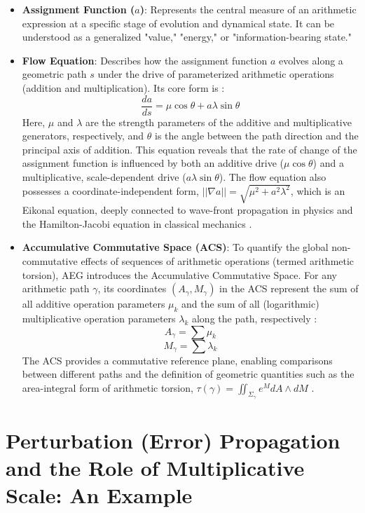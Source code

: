 \documentclass{article}
\begin{document}
\begin{itemize}
    \item \textbf{Assignment Function ($a$)}: Represents the central measure of an arithmetic expression at a specific stage of evolution and dynamical state. It can be understood as a generalized "value," "energy," or "information-bearing state."
    \item \textbf{Flow Equation}: Describes how the assignment function $a$ evolves along a geometric path $s$ under the drive of parameterized arithmetic operations (addition and multiplication). Its core form is \cite[Sec 3.1, Eq. 30]{YuanAEG}:
    $$\frac{da}{ds} = \mu \cos\theta + a\lambda \sin\theta$$
    Here, $\mu$ and $\lambda$ are the strength parameters of the additive and multiplicative generators, respectively, and $\theta$ is the angle between the path direction and the principal axis of addition. This equation reveals that the rate of change of the assignment function is influenced by both an additive drive ($\mu \cos\theta$) and a multiplicative, scale-dependent drive ($a\lambda \sin\theta$). The flow equation also possesses a coordinate-independent form, $||\nabla a|| = \sqrt{\mu^2 + a^2\lambda^2}$, which is an Eikonal equation, deeply connected to wave-front propagation in physics and the Hamilton-Jacobi equation in classical mechanics \cite[Sec 3.5, Eq. 57, 58]{YuanAEG}.
    \item \textbf{Accumulative Commutative Space (ACS)}: To quantify the global non-commutative effects of sequences of arithmetic operations (termed arithmetic torsion), AEG introduces the Accumulative Commutative Space. For any arithmetic path $\gamma$, its coordinates $(A_\gamma, M_\gamma)$ in the ACS represent the sum of all additive operation parameters $\mu_k$ and the sum of all (logarithmic) multiplicative operation parameters $\lambda_k$ along the path, respectively \cite[Sec 5.1]{YuanAEG}:
    $$A_\gamma = \sum \mu_k$$
    $$M_\gamma = \sum \lambda_k$$
    The ACS provides a commutative reference plane, enabling comparisons between different paths and the definition of geometric quantities such as the area-integral form of arithmetic torsion, $\tau(\gamma) = \iint_{\Sigma_\gamma} e^M dA \wedge dM$ \cite[Sec 5.1, Eq. 75]{YuanAEG}.
\end{itemize}

\section{Perturbation (Error) Propagation and the Role of Multiplicative Scale: An Example}
\end{document}

